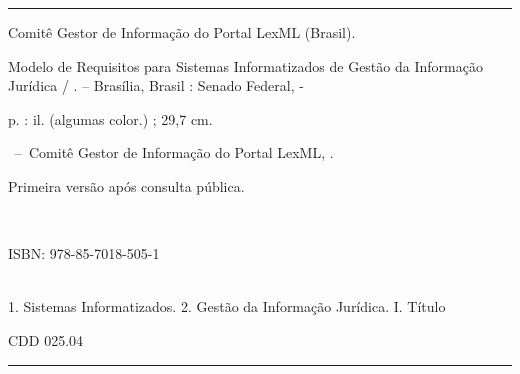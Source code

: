 \documentclass[a4paper,11pt,openright,twoside,brazil]{abntex2}
\begin{document}

\begin{fichacatalografica}\ABNTEXchapterfont
\vspace*{\fill} %
\hrule %
\begin{center} %
\begin{minipage}[c]{13cm} %
Comitê Gestor de Informação do Portal LexML (Brasil). \imprimirautor

\hspace{0.5cm} Modelo de Requisitos para Sistemas Informatizados de Gestão 
da Informação Jurídica / \imprimirautor. --
Brasília, Brasil : Senado Federal, \imprimirdata-

\hspace{0.5cm} \pageref{LastPage} p. : il. (algumas color.) ; 29,7 cm.\\

\hspace{0.5cm}
\parbox[t]{\textwidth}{\imprimirtipotrabalho~--~Comitê Gestor de Informação do 
Portal LexML, \imprimirdata.}

\hspace{0.5cm}
\parbox[t]{\textwidth}{Primeira versão após consulta pública.}\\

\hspace{0.5cm}
\parbox[t]{\textwidth}{ISBN: 978-85-7018-505-1}\\

\hspace{0.5cm}
1. Sistemas Informatizados.
2. Gestão da Informação Jurídica.
I. Título
\begin{flushright}
 CDD 025.04
\end{flushright}
\end{minipage}
\end{center}
\hrule
\end{fichacatalografica}

\cleardoublepage


\listoffigures*
\cleardoublepage

\listoftables*
\cleardoublepage
\end{document}
